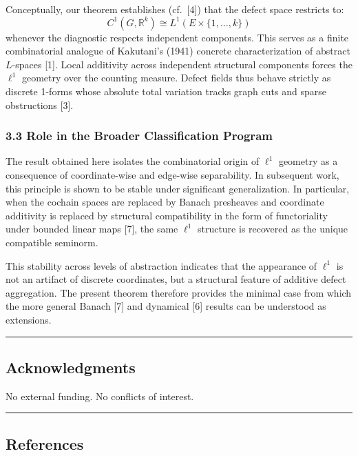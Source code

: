 \documentclass[
]{article}
\begin{document}
Conceptually, our theorem establishes (cf.~{[}4{]}) that the defect
space restricts to:
\[ C^1(G,\mathbb{R}^k) \cong L^1(E \times \{1,\dots,k\}) \] whenever the
diagnostic respects independent components. This serves as a finite
combinatorial analogue of Kakutani's (1941) concrete characterization of
abstract \(L\)-spaces {[}1{]}. Local additivity across independent
structural components forces the \(\ell^1\) geometry over the counting
measure. Defect fields thus behave strictly as discrete 1-forms whose
absolute total variation tracks graph cuts and sparse obstructions
{[}3{]}.

\subsubsection{3.3 Role in the Broader Classification
Program}\label{role-in-the-broader-classification-program}

The result obtained here isolates the combinatorial origin of \(\ell^1\)
geometry as a consequence of coordinate-wise and edge-wise separability.
In subsequent work, this principle is shown to be stable under
significant generalization. In particular, when the cochain spaces are
replaced by Banach presheaves and coordinate additivity is replaced by
structural compatibility in the form of functoriality under bounded
linear maps {[}7{]}, the same \(\ell^1\) structure is recovered as the
unique compatible seminorm.

This stability across levels of abstraction indicates that the
appearance of \(\ell^1\) is not an artifact of discrete coordinates, but
a structural feature of additive defect aggregation. The present theorem
therefore provides the minimal case from which the more general Banach
{[}7{]} and dynamical {[}6{]} results can be understood as extensions.

\begin{center}\rule{0.5\linewidth}{0.5pt}\end{center}

\subsection{Acknowledgments}\label{acknowledgments}

No external funding. No conflicts of interest.

\begin{center}\rule{0.5\linewidth}{0.5pt}\end{center}

\subsection{References}\label{references}
\end{document}
